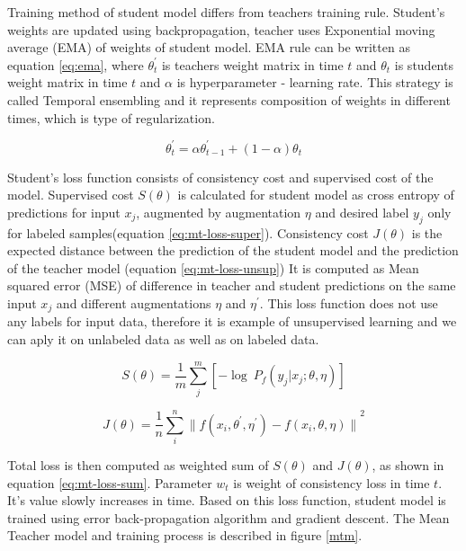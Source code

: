 Training method of student model differs from teachers training rule. Student's weights are updated using backpropagation, teacher uses  Exponential moving average (EMA) of weights of student model. EMA rule can be written as equation \ref{eq:ema}, where 
$\theta^\prime_t$ is teachers weight matrix in time $t$ and $\theta_{t}$ is students weight matrix in time $t$ and $\alpha$ is hyperparameter - learning rate. This strategy is called Temporal ensembling \cite{laine2016} and it represents composition of weights in different times, which is type of regularization.

\begin{equation}
    \theta_t^\prime = \alpha\theta^\prime_{t-1} + (1-\alpha)\theta_t
    \label{eq:ema}
\end{equation} 


Student's loss function consists of consistency cost and supervised cost of the model. 
Supervised cost $S(\theta)$ is calculated for student model as cross entropy of predictions for input $x_j$, augmented by augmentation $\eta$ and desired label $y_j$ only for labeled samples(equation \ref{eq:mt-loss-super}). Consistency cost  $J(\theta)$ is the expected distance between the prediction of the student model and the prediction of the teacher model (equation \ref{eq:mt-loss-unsup})  It is computed as Mean squared error (MSE) of difference in teacher and student predictions on the same input $x_j$ and different augmentations $\eta$ and $\eta^\prime$. This loss function does not use any labels for input data, therefore it is example of unsupervised learning and we can aply it on unlabeled data as well as on labeled data. 

\begin{equation}
	S(\theta) = \frac{1}{m} \sum_j^m \left[ -\log~P_f(y_j | x_j; \theta,\eta) \right]
	\label{eq:mt-loss-super}
\end{equation} 

\begin{equation}
	J(\theta) = \frac{1}{n} \sum_i^n {\| f(x_i,\theta^{\prime},\eta^{\prime}) - f(x_i,\theta,\eta) \|}^2
	\label{eq:mt-loss-unsup}
\end{equation} 

\noindent Total loss is then computed as weighted sum of $S(\theta)$ and $J(\theta)$, as shown in equation \ref{eq:mt-loss-sum}. Parameter $w_t$ is weight of consistency loss in time $t$. It's value slowly increases in time. Based on this loss function, student model is trained using error back-propagation algorithm and gradient descent.
The Mean Teacher model and training process is described in figure \ref{mtm}.

